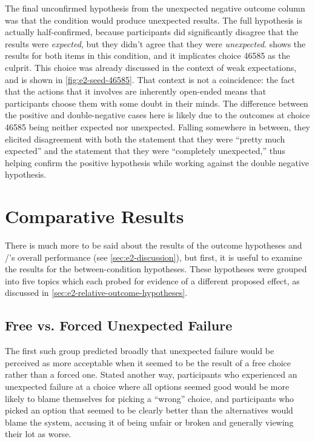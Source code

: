 The final unconfirmed hypothesis from the unexpected negative outcome column was that the \unxf{} condition would produce unexpected results.
%
The full hypothesis is actually half-confirmed, because participants did significantly disagree that the results were \emph{expected}, but they didn't agree that they were \emph{unexpected}.
%
 shows the results for both items in this condition, and it implicates choice 46585 as the culprit.
%
This choice was already discussed in the context of weak expectations, and is shown in \cref{fig:e2-seed-46585}.
%
That context is not a coincidence: the fact that the actions that it involves are inherently open-ended means that participants choose them with some doubt in their minds.
%
The difference between the positive and double-negative cases here is likely due to the outcomes at choice 46585 being neither expected nor unexpected.
%
Falling somewhere in between, they elicited disagreement with both the statement that they were ``pretty much expected'' and the statement that they were ``completely unexpected,'' thus helping confirm the positive hypothesis while working against the double negative hypothesis.


\section{Comparative Results}

There is much more to be said about the results of the outcome hypotheses and \dunyazad/'s overall performance (see \cref{sec:e2-discussion}), but first, it is useful to examine the results for the between-condition hypotheses.
%
These hypotheses were grouped into five topics which each probed for evidence of a different proposed effect, as discussed in \cref{sec:e2-relative-outcome-hypotheses}.

\subsection{Free vs\@. Forced Unexpected Failure}

The first such group predicted broadly that unexpected failure would be perceived as more acceptable when it seemed to be the result of a free choice rather than a forced one.
%
Stated another way, participants who experienced an unexpected failure at a choice where all options seemed good would be more likely to blame themselves for picking a ``wrong'' choice, and participants who picked an option that seemed to be clearly better than the alternatives would blame the system, accusing it of being unfair or broken and generally viewing their lot as worse.

